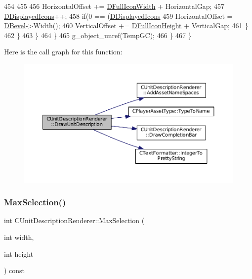 \begin{DoxyCode}
454                     
455                     
456                     HorizontalOffset += \hyperlink{classCUnitDescriptionRenderer_a4bd79032fe13b9c09386a24cb8ef7650}{DFullIconWidth} + HorizontalGap;
457                     \hyperlink{classCUnitDescriptionRenderer_a0f2d234d02c615ac28812508c77ec414}{DDisplayedIcons}++;
458                     \textcolor{keywordflow}{if}(0 == (\hyperlink{classCUnitDescriptionRenderer_a0f2d234d02c615ac28812508c77ec414}{DDisplayedIcons} %
459                         HorizontalOffset = \hyperlink{classCUnitDescriptionRenderer_a9f4cd9f9d8dbc5036c885980494db41e}{DBevel}->Width();
460                         VerticalOffset +=  \hyperlink{classCUnitDescriptionRenderer_ae9f7d843d0eabd4b1f1b19bfa5332754}{DFullIconHeight} + VerticalGap;
461                     \}
462                 \}
463             \}
464         \}
465         g\_object\_unref(TempGC);
466     \}
467 \}
\end{DoxyCode}
Here is the call graph for this function\+:
\nopagebreak
\begin{figure}[H]
\begin{center}
\leavevmode
\includegraphics[width=350pt]{classCUnitDescriptionRenderer_a129cfc5d3942ebc37b9ca51530bf4daa_cgraph}
\end{center}
\end{figure}
\hypertarget{classCUnitDescriptionRenderer_a13289f29576ca1e55ed910aa7fef76e2}{}\label{classCUnitDescriptionRenderer_a13289f29576ca1e55ed910aa7fef76e2} 
\subsubsection{\texorpdfstring{Max\+Selection()}{MaxSelection()}}
{\footnotesize\ttfamily int C\+Unit\+Description\+Renderer\+::\+Max\+Selection (\begin{DoxyParamCaption}\item[{int}]{width,  }\item[{int}]{height }\end{DoxyParamCaption}) const}



